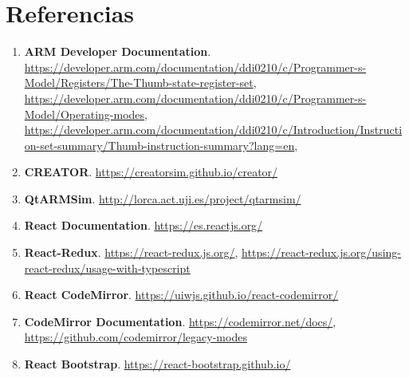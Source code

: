 \section{Referencias}
{
    \begin{enumerate}
        \item \textbf{ARM Developer Documentation}. \href{https://developer.arm.com/documentation/ddi0210/c/Programmer-s-Model/Registers/The-Thumb-state-register-set}{https://developer.arm.com/documentation/ddi0210/c/Programmer-s-Model/Registers/The-Thumb-state-register-set}, 
            \href{https://developer.arm.com/documentation/ddi0210/c/Programmer-s-Model/Operating-modes}{https://developer.arm.com/documentation/ddi0210/c/Programmer-s-Model/Operating-modes}, \href{https://developer.arm.com/documentation/ddi0210/c/Introduction/Instruction-set-summary/Thumb-instruction-summary?lang=en}{https://developer.arm.com/documentation/ddi0210/c/Introduction/Instruction-set-summary/Thumb-instruction-summary?lang=en},
        \item \textbf{CREATOR}. \href{https://creatorsim.github.io/creator/}{https://creatorsim.github.io/creator/}
        \item \textbf{QtARMSim}. \href{http://lorca.act.uji.es/project/qtarmsim/}{http://lorca.act.uji.es/project/qtarmsim/}
        \item \textbf{React Documentation}. \href{https://es.reactjs.org/}{https://es.reactjs.org/}
        \item \textbf{React-Redux}. \href{https://react-redux.js.org/}{https://react-redux.js.org/}, \href{https://react-redux.js.org/using-react-redux/usage-with-typescript}{https://react-redux.js.org/using-react-redux/usage-with-typescript}
        \item \textbf{React CodeMirror}. \href{https://uiwjs.github.io/react-codemirror/}{https://uiwjs.github.io/react-codemirror/}
        \item \textbf{CodeMirror Documentation}. \href{https://codemirror.net/docs/}{https://codemirror.net/docs/}, \href{https://github.com/codemirror/legacy-modes}{https://github.com/codemirror/legacy-modes}
        \item \textbf{React Bootstrap}. \href{https://react-bootstrap.github.io/}{https://react-bootstrap.github.io/}
    \end{enumerate}
}

